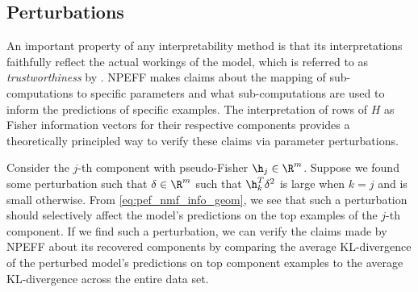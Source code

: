 \documentclass[dvipsnames]{article}
\begin{document}
\subsection{Perturbations}\label{sec:methods_perturbations}
An important property of any interpretability method is that its interpretations faithfully reflect the actual workings of the model, which is referred to as \textit{trustworthiness} by \citep{li2022interpretable}.
NPEFF makes claims about the mapping of sub-computations to specific parameters and what sub-computations are used to inform the predictions of specific examples.
The interpretation of rows of $H$ as Fisher information vectors for their respective components provides a theoretically principled way to verify these claims via parameter perturbations.

Consider the $j$-th component with pseudo-Fisher $\h_j \in \R^m$.
Suppose we found some perturbation such that $\delta \in \R^m$ such that $\h_k^T\delta^2$ is large when $k=j$ and is small otherwise.
From \eqref{eq:pef_nmf_info_geom}, we see that such a perturbation should selectively affect the model's predictions on the top examples of the $j$-th component.
If we find such a perturbation, we can verify the claims made by NPEFF about its recovered components by comparing the average KL-divergence of the perturbed model's predictions on top component examples to the average KL-divergence across the entire data set.



\end{document}
